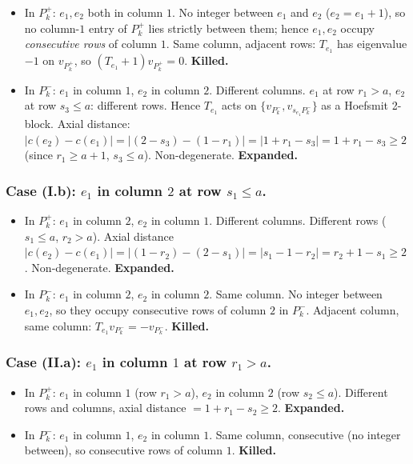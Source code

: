 \documentclass[11pt]{article}
\theoremstyle{definition}
\begin{document}
\begin{itemize}[leftmargin=2em,topsep=0.3em,itemsep=0.2em]
\item In $P_k^+$: $e_1,e_2$ both in column $1$.  No integer between
$e_1$ and $e_2$ ($e_2=e_1+1$), so no column-$1$ entry of $P_k^+$ lies
strictly between them; hence $e_1,e_2$ occupy \emph{consecutive
rows} of column $1$.  Same column, adjacent rows: $T_{e_1}$ has
eigenvalue $-1$ on $v_{P_k^+}$, so $(T_{e_1}{+}1)v_{P_k^+}=0$.
\textbf{Killed.}
\item In $P_k^-$: $e_1$ in column $1$, $e_2$ in column $2$.
Different columns.  $e_1$ at row $r_1>a$, $e_2$ at row $s_3\le a$:
different rows.  Hence $T_{e_1}$ acts on $\{v_{P_k^-},v_{s_{e_1}P_k^-}\}$
as a Hoefsmit 2-block.  Axial distance:
$|c(e_2)-c(e_1)|=|(2-s_3)-(1-r_1)|=|1+r_1-s_3|=1+r_1-s_3\ge 2$
(since $r_1\ge a+1$, $s_3\le a$).  Non-degenerate.  \textbf{Expanded.}
\end{itemize}

\subsubsection*{Case (I.b): $e_1$ in column $2$ at row $s_1\le a$.}

\begin{itemize}[leftmargin=2em,topsep=0.3em,itemsep=0.2em]
\item In $P_k^+$: $e_1$ in column $2$, $e_2$ in column $1$.
Different columns.  Different rows ($s_1\le a$, $r_2>a$).  Axial
distance $|c(e_2)-c(e_1)|=|(1-r_2)-(2-s_1)|=|s_1-1-r_2|=r_2+1-s_1\ge 2$.
Non-degenerate.  \textbf{Expanded.}
\item In $P_k^-$: $e_1$ in column $2$, $e_2$ in column $2$.  Same
column.  No integer between $e_1,e_2$, so they occupy consecutive
rows of column $2$ in $P_k^-$.  Adjacent column, same column:
$T_{e_1}v_{P_k^-}=-v_{P_k^-}$.  \textbf{Killed.}
\end{itemize}

\subsubsection*{Case (II.a):  $e_1$ in column $1$ at row $r_1>a$.}

\begin{itemize}[leftmargin=2em,topsep=0.3em,itemsep=0.2em]
\item In $P_k^+$: $e_1$ in column $1$ (row $r_1>a$), $e_2$ in column
$2$ (row $s_2\le a$).  Different rows and columns, axial distance
$=1+r_1-s_2\ge 2$.  \textbf{Expanded.}
\item In $P_k^-$: $e_1$ in column $1$, $e_2$ in column $1$.  Same
column, consecutive (no integer between), so consecutive rows of
column $1$.  \textbf{Killed.}
\end{itemize}
\end{document}
